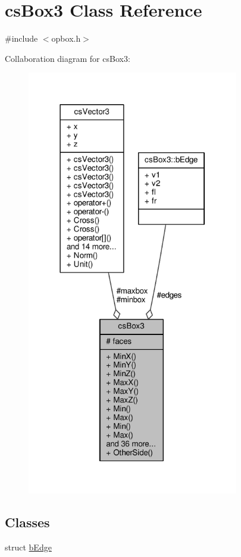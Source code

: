 \hypertarget{classcsBox3}{}\section{cs\+Box3 Class Reference}
\label{classcsBox3}


{\ttfamily \#include $<$opbox.\+h$>$}



Collaboration diagram for cs\+Box3\+:
\nopagebreak
\begin{figure}[H]
\begin{center}
\leavevmode
\includegraphics[width=262pt]{d8/de4/classcsBox3__coll__graph}
\end{center}
\end{figure}
\subsection*{Classes}
\begin{DoxyCompactItemize}
\item 
struct \hyperlink{structcsBox3_1_1bEdge}{b\+Edge}
\end{DoxyCompactItemize}
